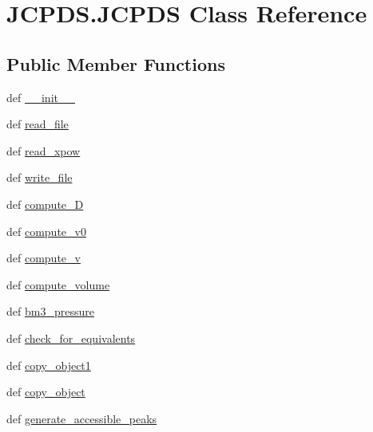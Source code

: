 \hypertarget{class_j_c_p_d_s_1_1_j_c_p_d_s}{\section{J\-C\-P\-D\-S.\-J\-C\-P\-D\-S Class Reference}
\label{class_j_c_p_d_s_1_1_j_c_p_d_s}
}
\subsection*{Public Member Functions}
\begin{DoxyCompactItemize}
\item 
def \hyperlink{class_j_c_p_d_s_1_1_j_c_p_d_s_aca0207da67855730a22a3bbcd031c1d3}{\-\_\-\-\_\-init\-\_\-\-\_\-}
\item 
def \hyperlink{class_j_c_p_d_s_1_1_j_c_p_d_s_ab3335931a8dbbff1bff32de39d752723}{read\-\_\-file}
\item 
def \hyperlink{class_j_c_p_d_s_1_1_j_c_p_d_s_a728290518d30c0c2df73cf1383515768}{read\-\_\-xpow}
\item 
def \hyperlink{class_j_c_p_d_s_1_1_j_c_p_d_s_a229ed071c04b6cb367ea7b349539e711}{write\-\_\-file}
\item 
def \hyperlink{class_j_c_p_d_s_1_1_j_c_p_d_s_a9bce7cbc5045239ca4175d750256e6aa}{compute\-\_\-\-D}
\item 
def \hyperlink{class_j_c_p_d_s_1_1_j_c_p_d_s_a3d9ee706776a7e24826e8a21ac8ac51a}{compute\-\_\-v0}
\item 
def \hyperlink{class_j_c_p_d_s_1_1_j_c_p_d_s_a15973313ee7187e0e0bef03b1aebed0e}{compute\-\_\-v}
\item 
def \hyperlink{class_j_c_p_d_s_1_1_j_c_p_d_s_aa837bef35e9c46e89a6c2673dfaa10b8}{compute\-\_\-volume}
\item 
def \hyperlink{class_j_c_p_d_s_1_1_j_c_p_d_s_ad256df2c1ea42c6ed31ff86bb577981a}{bm3\-\_\-pressure}
\item 
def \hyperlink{class_j_c_p_d_s_1_1_j_c_p_d_s_a73e3fb2c332bde54412906eaf49b5693}{check\-\_\-for\-\_\-equivalents}
\item 
def \hyperlink{class_j_c_p_d_s_1_1_j_c_p_d_s_acd0737c833865f0efd2b3e8dd273c909}{copy\-\_\-object1}
\item 
def \hyperlink{class_j_c_p_d_s_1_1_j_c_p_d_s_a3ce0c985ae5d2016ace2766ca2f520ee}{copy\-\_\-object}
\item 
def \hyperlink{class_j_c_p_d_s_1_1_j_c_p_d_s_aa3b28978840f14b05fa13d88d083b214}{generate\-\_\-accessible\-\_\-peaks}
\item 

\end{DoxyCompactItemize}
